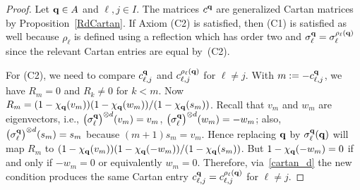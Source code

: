 \documentclass[10pt,a4paper]{article}
\numberwithin{equation}{section}
\newcommand{\qq }{{\bf q}}
\newcommand{\dn }{d}
\newcommand{\bich }{\chi}
\begin{document}
\begin{proof}
Let $\qq\in A$ and $\ell,j \in I$.
The matrices $c^\qq$ are generalized Cartan matrices by Proposition~\ref{RdCartan}.
If Axiom (C2) is satisfied, then (C1) is satisfied as well because $\rho_\ell$ is defined using a reflection which has order two and $\sigma^{\qq}_\ell = \sigma^{\rho_\ell(\qq)}_\ell$ since the relevant Cartan entries are equal by~(C2).

For (C2), we need to compare $c^\qq_{\ell,j}$ and $c^{\rho_\ell(\qq)}_{\ell,j}$ for $\ell\ne j$.
With $m:=-c^\qq_{\ell,j}$, we have $R_m=0$ and $R_k\ne 0$ for $k<m$.
Now $R_m = (1-\bich_\qq(v_m))(1-\bich_\qq(w_m))/(1-\chi_\qq(s_m))$.
Recall that $v_m$ and $w_m$ are eigenvectors, i.e., $\big(\sigma^{\qq}_\ell\big)^{\otimes \dn}(v_m) = v_m$,
$\big(\sigma^{\qq}_\ell\big)^{\otimes \dn}(w_m) = -w_m$;
also, $\big(\sigma^{\qq}_\ell\big)^{\otimes \dn}(s_m) = s_m$ because $(m+1)s_m=v_m$.
Hence replacing $\qq$ by $\sigma^{\qq}_\ell (\qq)$ will map $R_m$ to
$(1-\bich_\qq(v_m))(1-\bich_\qq(-w_m))/(1-\chi_\qq(s_m))$.
But $1-\bich_\qq(-w_m)=0$ if and only if $-w_m=0$ or equivalently $w_m=0$.
Therefore, via~\eqref{cartan_d} the new condition produces the same Cartan entry
$c^\qq_{\ell,j}=c^{\rho_\ell(\qq)}_{\ell,j}$ for $\ell\ne j$.
\end{proof}
\end{document}
